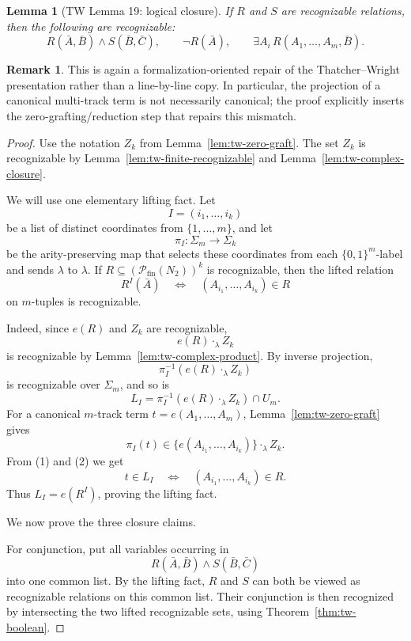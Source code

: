 \documentclass[11pt]{article}
\newtheorem{lemma}[theorem]{Lemma}
\theoremstyle{definition}
\newtheorem{remark}[theorem]{Remark}
\newcommand{\TW}{Thatcher--Wright}
\newcommand{\powfin}{\mathcal P_{\mathrm{fin}}}
\begin{document}
\begin{lemma}[TW Lemma 19: logical closure]\label{lem:tw-logical-closure}
If \(R\) and \(S\) are recognizable relations, then the following are
recognizable:
\[
  R(\bar A,\bar B)\wedge S(\bar B,\bar C),\qquad
  \neg R(\bar A),\qquad
  \exists A_i\,R(A_1,\ldots,A_m,\bar B).
\]
\end{lemma}

\begin{remark}
This is again a formalization-oriented repair of the \TW{} presentation rather
than a line-by-line copy.  In particular, the projection of a canonical
multi-track term is not necessarily canonical; the proof explicitly inserts the
zero-grafting/reduction step that repairs this mismatch.
\end{remark}

\begin{proof}
Use the notation \(Z_k\) from Lemma~\ref{lem:tw-zero-graft}.  The set \(Z_k\)
is recognizable by
Lemma~\ref{lem:tw-finite-recognizable} and
Lemma~\ref{lem:tw-complex-closure}.

We will use one elementary lifting fact.  Let
\[
  I=(i_1,\ldots,i_k)
\]
be a list of distinct coordinates from \(\{1,\ldots,m\}\), and let
\[
  \pi_I:\Sigma_m\to\Sigma_k
\]
be the arity-preserving map that selects these coordinates from each
\(\{0,1\}^m\)-label and sends \(\lambda\) to \(\lambda\).  If
\(R\subseteq(\powfin(N_2))^k\) is recognizable, then the lifted relation
\[
  R^I(\bar A)
  \quad\Longleftrightarrow\quad
  (A_{i_1},\ldots,A_{i_k})\in R
\]
on \(m\)-tuples is recognizable.

Indeed, since \(e(R)\) and \(Z_k\) are recognizable,
\[
  e(R)\cdot_\lambda Z_k
\]
is recognizable by Lemma~\ref{lem:tw-complex-product}.  By inverse projection,
\[
  \pi_I^{-1}(e(R)\cdot_\lambda Z_k)
\]
is recognizable over \(\Sigma_m\), and so is
\[
  L_I=\pi_I^{-1}(e(R)\cdot_\lambda Z_k)\cap U_m.       \tag{1}
\]
For a canonical \(m\)-track term \(t=e(A_1,\ldots,A_m)\),
Lemma~\ref{lem:tw-zero-graft} gives
\[
  \pi_I(t)\in
  \{e(A_{i_1},\ldots,A_{i_k})\}\cdot_\lambda Z_k.       \tag{2}
\]
From (1) and (2) we get
\[
  t\in L_I
  \quad\Longleftrightarrow\quad
  (A_{i_1},\ldots,A_{i_k})\in R.
\]
Thus \(L_I=e(R^I)\), proving the lifting fact.

We now prove the three closure claims.

For conjunction, put all variables occurring in
\[
  R(\bar A,\bar B)\wedge S(\bar B,\bar C)
\]
into one common list.  By the lifting fact, \(R\) and \(S\) can both be viewed as
recognizable relations on this common list.  Their conjunction is then
recognized by intersecting the two lifted recognizable sets, using
Theorem~\ref{thm:tw-boolean}.


\end{proof}
\end{document}
